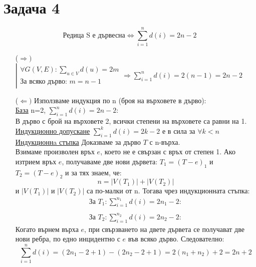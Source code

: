 \documentclass{article}
\begin{document}
\section*{Задача 4}
\[
    \text{Редица S е дървесна} \Longleftrightarrow \sum_{i=1}^{n}d(i)=2n-2
\]
\begin{itemize}
    \item[($\Rightarrow)$]$\left|\begin{array}{c}
            \forall G(V,E):\sum_{u\in V}d(u)=2m \\
            \text{За всяко дърво: }m=n-1
        \end{array}\right.\Longrightarrow\sum_{i=1}^{n}d(i)=2(n-1)=2n-2$
    \item[($\Leftarrow)$]Използваме индукция по n (броя на върховете в дърво):\\
    \underline{База} n=2, $\sum_{i=1}^{n}d(i)=2n-2$:\\ В дърво с брой на върховете 2, всички степени на върховете са равни на 1. \checkmark\\
    \underline{Индукционно допускане} $\sum_{i=1}^{k}d(i)=2k-2$ е в сила за $\forall k<n$\\
    \underline{Индукционнa стъпка} Доказваме за дърво $T$ с n-върха.\\
    Взимаме произволен връх $e$, което не е свързан с връх от степен 1.
    Ако изтрием връх $e$, получаваме две нови дървета: $T_1=(T-e)_1$ и $T_2=(T-e)_2$
    и за тях знаем, че:
    \[
        n=|V(T_1)|+|V(T_2)|
    \]
    и $|V(T_1)|$ и $|V(T_2)|$ са по-малки от n. Тогава чрез индукционната стъпка:
    \[\begin{array}{c}
            \text{За }T_1: \sum_{i=1}^{n_1}d(i)=2n_1-2: \\\\
            \text{За }T_2: \sum_{i=1}^{n_2}d(i)=2n_2-2:
        \end{array}
    \]
    Когато върнем върха $e$, при свързването на двете дървета се получават две нови ребра,
    по едно инцидентно с $e$ във всяко дърво. Следователно:
    \[
        \sum_{i=1}^{n}d(i)=(2n_1-2+1)-(2n_2-2+1)=2(n_1+n_2)+2=2n+2
    \]


\end{itemize}
\end{document}
